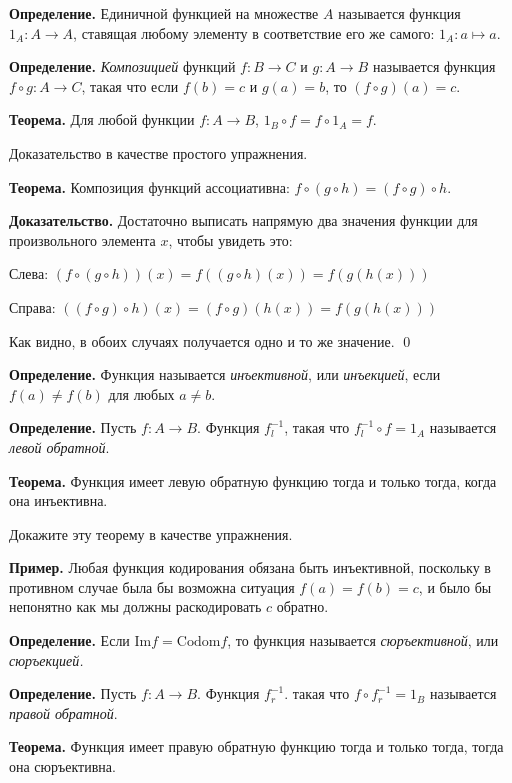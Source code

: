 {\bfseries Определение.} Единичной функцией на множестве $A$ называется функция $1_A: A\to A$, ставящая любому элементу в соответствие его же самого: $1_A: a\mapsto a$.

{\bfseries Определение.} {\slshape Композицией} функций $f:B\to C$ и $g:A\to B$ называется функция $f\circ g: A\to C$, такая что если $f(b) = c$ и $g(a) = b$, то $(f\circ g)(a) = c$.

{\bfseries Теорема.} Для любой функции $f: A\to B$, $1_B \circ f = f \circ 1_A = f$.

Доказательство в качестве простого упражнения.

{\bfseries Теорема.} Композиция функций ассоциативна: $f\circ (g \circ h) = (f\circ g)\circ h$.

{\bfseries Доказательство.} Достаточно выписать напрямую два значения функции для произвольного элемента $x$, чтобы увидеть это:

Слева: $(f\circ (g \circ h)) (x) = f((g\circ h)(x)) = f(g(h(x)))$

Справа: $((f\circ g) \circ h) (x) = (f\circ g)(h(x)) = f(g(h(x)))$

Как видно, в обоих случаях получается одно и то же значение. \qed

{\bfseries Определение.} Функция называется {\slshape инъективной}, или {\slshape инъекцией}, если $f(a)\not= f(b)$ для любых $a\not= b$.

{\bfseries Определение.} Пусть $f:A\to B$. Функция $f^{-1}_l$, такая что $f^{-1}_l\circ f = 1_A$ называется {\slshape левой обратной}.

{\bfseries Теорема.} Функция имеет левую обратную функцию тогда и только тогда, когда она инъективна.

Докажите эту теорему в качестве упражнения.

{\bfseries Пример.} Любая функция кодирования обязана быть инъективной, поскольку в противном случае была бы возможна ситуация $f(a) = f(b) = c$, и было бы непонятно как мы должны раскодировать $c$ обратно.

{\bfseries Определение.} Если $\mathrm{Im}f = \mathrm{Codom}f$, то функция называется {\slshape сюръективной}, или {\slshape сюръекцией.}

{\bfseries Определение.} Пусть $f: A\to B$. Функция $f^{-1}_r$. такая что $f\circ f^{-1}_r = 1_B$ называется {\slshape правой обратной}.

{\bfseries Теорема.} Функция имеет правую обратную функцию тогда и только тогда, тогда она сюръективна.

